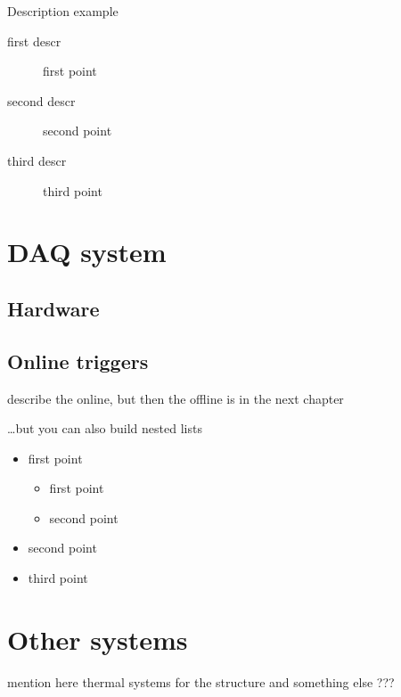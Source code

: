 \noindent
Description example
\begin{description}
\item[first descr] first point
\item[second descr]  second point
\item[third descr]  third point\\
\end{description}

\section[DAQ system]{DAQ system}

\subsection[Hardware]{Hardware}

\subsection[Online triggers]{Online triggers}

describe the online, but then the offline is in the next chapter

\noindent
\dots but you can also build nested lists
\begin{itemize}
\item first point
	\begin{itemize} %
	\item first point
	\item second point
	\end{itemize}
\item second point
\item third point \\
\end{itemize}




\section[Other systems]{Other systems}

mention here thermal systems for the structure and something else ???

